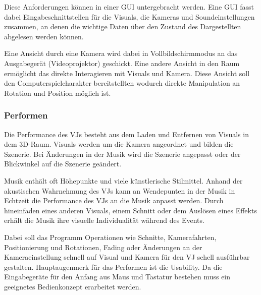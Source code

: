 Diese Anforderungen k\"onnen in einer GUI untergebracht werden. Eine GUI fasst dabei Eingabeschnittstellen f\"ur die Visuals,
die Kameras und Soundeinstellungen zusammen, an denen die wichtige Daten \"uber den Zustand des Dargestellten abgelesen
werden k\"onnen.

Eine Ansicht durch eine Kamera wird dabei in Vollbildschirmmodus an das Ausgabeger\"at (Videoprojektor) geschickt. Eine 
andere Ansicht in den Raum erm\"oglicht das direkte Interagieren mit Visuals und Kamera. Diese Ansicht soll den
Computerspielcharakter bereitstellten wodurch direkte Manipulation an Rotation und Position m\"oglich ist.





\subsubsection{Performen}

Die Performance des VJs besteht aus dem Laden und Entfernen von Visuals in dem 3D-Raum. Visuals werden um die
Kamera angeordnet und bilden die Szenerie. Bei \"Anderungen in der Musik wird die Szenerie angepasst oder der
Blickwinkel auf die Szenerie ge\"andert. 

Musik enth\"alt oft H\"ohepunkte und viele k\"unstlerische Stilmittel.
Anhand der akustischen Wahrnehmung des VJs kann an Wendepunten in der Musik in Echtzeit die Performance des VJs
an die Musik anpasst werden. Durch hineinfaden eines anderen Visuals, einem Schnitt oder dem Ausl\"osen eines 
Effekts erh\"alt die Musik ihre visuelle Individualit\"at w\"ahrend des Events.

Dabei soll das Programm Operationen wie Schnitte, Kamerafahrten, Positionierung und Rotationen, Fading oder
\"Anderungen an der Kameraeinstellung schnell auf Visual und Kamera f\"ur den VJ schell ausf\"uhrbar gestalten.
Hauptaugenmerk f\"ur das Performen ist die Usability. Da die Eingabeger\"ate f\"ur den Anfang aus 
Maus und Tastatur bestehen muss ein geeignetes Bedienkonzept erarbeitet werden.

